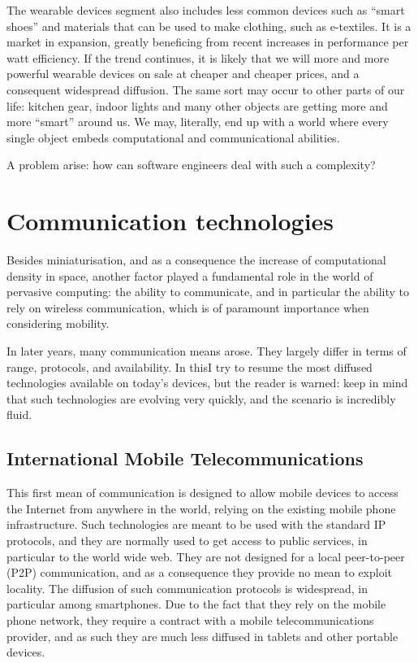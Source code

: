 \documentclass[12pt,a4paper,twoside,openright]{book}
\begin{document}
The wearable devices segment also includes less common devices such as ``smart shoes'' and materials that can be used to make clothing, such as e-textiles.
%
It is a market in expansion, greatly beneficing from recent increases in performance per watt efficiency.
%
If the trend continues, it is likely that we will more and more powerful wearable devices on sale at cheaper and cheaper prices, and a consequent widespread diffusion.
%
The same sort may occur to other parts of our life: kitchen gear, indoor lights and many other objects are getting more and more ``smart'' around us.
%
We may, literally, end up with a world where every single object embeds computational and communicational abilities.

A problem arise: how can software engineers deal with such a complexity?

\section{Communication technologies}

Besides miniaturisation, and as a consequence the increase of computational density in space, another factor played a fundamental role in the world of pervasive computing: the ability to communicate, and in particular the ability to rely on wireless communication, which is of paramount importance when considering mobility.

In later years, many communication means arose.
%
They largely differ in terms of range, protocols, and availability.
%
In this\levelText{}I try to resume the most diffused technologies available on today's devices, but the reader is warned: keep in mind that such technologies are evolving very quickly, and the scenario is incredibly fluid.

\subsection{International Mobile Telecommunications}
\label{International Mobile Telecommunications}

This first mean of communication is designed to allow mobile devices to access the Internet from anywhere in the world, relying on the existing mobile phone infrastructure.
%
Such technologies are meant to be used with the standard IP protocols, and they are normally used to get access to public services, in particular to the world wide web.
%
They are not designed for a local peer-to-peer (P2P) communication, and as a consequence they provide no mean to exploit locality.
%
The diffusion of such communication protocols is widespread, in particular among smartphones.
%
Due to the fact that they rely on the mobile phone network, they require a contract with a mobile telecommunications provider, and as such they are much less diffused in tablets and other portable devices.
\end{document}
